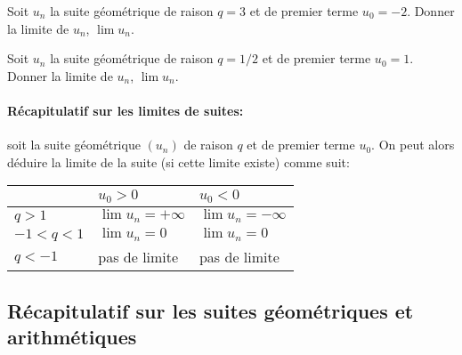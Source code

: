 \documentclass[a4paper,12pt]{scrartcl}
\begin{document}
\exemple Soit $u_n$ la suite géométrique de raison $q = 3$ et de premier terme $u_0 = -2$. Donner la limite de $u_n$, $\lim u_n$. 


\exemple Soit $u_n$ la suite géométrique de raison $q = 1/2$ et de premier terme $u_0 = 1$. Donner la limite de $u_n$, $\lim u_n$. 

\paragraph{Récapitulatif sur les limites de suites:}

soit la suite géométrique $(u_n)$ de raison $q$ et de premier terme $u_0$. On peut alors déduire la limite de la suite (si cette limite existe) comme suit:

\begin{center}
\begin{tabular}{|l|l|l|}\hline
 & $u_0 > 0$ & $u_0 < 0$ \\ \hline 
$q>1$ & $\lim u_n = +\infty$ & $\lim u_n = -\infty$ \\ \hline 
$-1 < q < 1$ & $\lim u_n = 0$ & $\lim u_n = 0$ \\ \hline 
$q < -1$ & pas de limite & pas de limite \\ \hline 
\end{tabular}
\end{center}

\subsection*{Récapitulatif sur les suites géométriques et arithmétiques}
\end{document}
